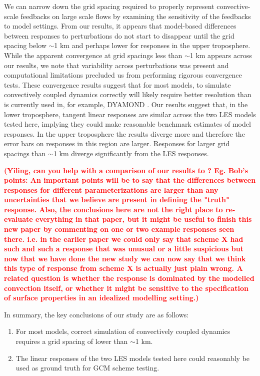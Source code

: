 \documentclass[draft]{agujournal2019}
\newcommand{\todo}[1]{\textcolor{red}{\textbf{(#1)}}}
\begin{document}
We can narrow down the grid spacing required to properly represent
convective-scale feedbacks on large scale flows by examining the sensitivity of
the feedbacks to model settings. From our results, it appears that model-based
differences between responses to perturbations do not start to disappear until
the grid spacing below $\sim$1 km and perhaps lower for responses in the upper
troposphere. While the apparent convergence at grid spacings less than $\sim$1
km appears across our results, we note that variability across perturbations was
present and computational limitations precluded us from performing rigorous
convergence tests. These convergence results suggest that for most models, to
simulate convectively coupled dynamics correctly will likely require better
resolution than is currently used in, for example, DYAMOND
\cite{Stevens_PEPS_2019}. Our results suggest that, in the lower troposphere,
tangent linear responses are similar across the two LES models tested here,
implying they could make reasonable benchmark estimates of model responses. In
the upper troposphere the results diverge more and therefore the error bars on
responses in this region are larger. Responses for larger grid spacings than
$\sim$1 km diverge significantly from the LES responses.

\todo{Yiling, can you help with a comparison of our results to
\citeA{Hwong_JAMES_2021}? Eg. Bob's points: An important points will be to say
that the differences between responses for different parameterizations are
larger than any uncertainties that we believe are present in defining the
"truth" response. Also, the conclusions here are not the right place to
re-evaluate everything in that paper, but it might be useful to finish this new
paper by commenting on one or two example responses seen there. i.e. in the
earlier paper we could only say that scheme X had such and such a response that
was unusual or a little suspicious but now that we have done the new study we
can now say that we think this type of response from scheme X is actually just
plain wrong. A related question is whether the response is dominated by the
modelled convection itself, or whether it might be sensitive to the
specification of surface properties in an idealized modelling setting.}

In summary, the key conclusions of our study are as follows:

\begin{enumerate}
    \item For most models, correct simulation of convectively coupled dynamics requires a grid spacing of lower than $\sim$1 km.
    \item The linear responses of the two LES models tested here could reasonably be used as ground truth for GCM scheme testing.
\end{enumerate}
\end{document}
